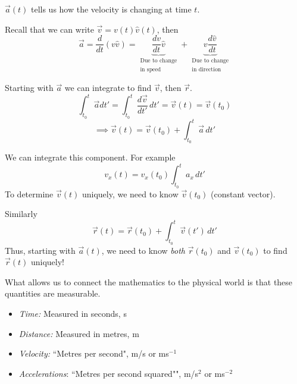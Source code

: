 \documentclass[10pt]{scrartcl}
\begin{document}
$\vec{a}(t)$ tells us how the velocity is changing at time $t$. 

Recall that we can write $\vec{v} = v(t)\hat{v}(t)$, then
\[\vec{a} = \frac{d}{dt}(v\hat{v}) = \underbrace{\frac{dv}{dt}\hat{v}}_{\substack{\text{Due to change}\\ \text{in speed}}} + \underbrace{v\frac{d\hat{v}}{dt}}_{\substack{\text{Due to change}\\ \text{in direction}}}\]



Starting with $\vec{a}$ we can integrate to find $\vec{v}$, then $\vec{r}$. 
\[\int_{t_0}^{t} \vec{a}dt' = \int_{t_0}^{t} \frac{d\vec{v}}{dt'}\,dt' = \vec{v}(t) = \vec{v}(t_0)
\]
\[\implies \vec{v}(t) = \vec{v}(t_0) + \int_{t_0}^t \vec{a}\,dt'\]

We can integrate this component. For example 
\[v_x(t) = v_x(t_0) \int_{t_0}^t a_x\,dt'\]
To determine $\vec{v}(t)$ uniquely, we need to know $\vec{v}(t_0)$ (constant vector). 

Similarly
\[\vec{r}(t) = \vec{r}(t_0) + \int_{t_0}^t \vec{v}(t')\,dt'\]
Thus, starting with $\vec{a}(t)$, we need to know \emph{both} $\vec{r}(t_0)$ and $\vec{v}(t_0)$ to find $\vec{r}(t)$ uniquely! 

What allows us to connect the mathematics to the physical world is that these quantities are measurable. \\

\begin{definition}[SI Units]\begin{itemize}
\item \emph{Time:} Measured in seconds, s

\item \emph{Distance:} Measured in metres, m

\item \emph{Velocity:} ``Metres per second", m/s or ms$^{-1}$
	
\item \emph{Accelerations}: ``Metres per second squared"", m/s$^2$ or ms$^{-2}$
\end{itemize}
\end{definition}\vsp
\end{document}
